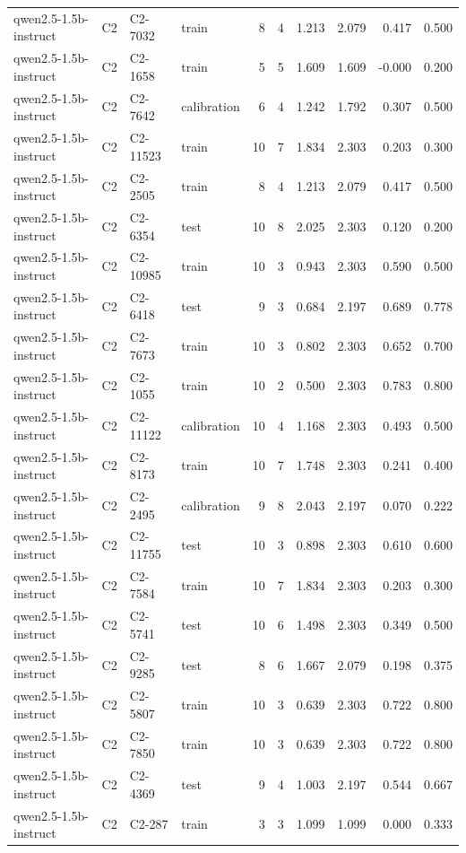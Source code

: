 \begin{table}
\begin{tabular}{llllrrrrrr}
qwen2.5-1.5b-instruct & C2 & C2-7032 & train & 8 & 4 & 1.213 & 2.079 & 0.417 & 0.500 \\
qwen2.5-1.5b-instruct & C2 & C2-1658 & train & 5 & 5 & 1.609 & 1.609 & -0.000 & 0.200 \\
qwen2.5-1.5b-instruct & C2 & C2-7642 & calibration & 6 & 4 & 1.242 & 1.792 & 0.307 & 0.500 \\
qwen2.5-1.5b-instruct & C2 & C2-11523 & train & 10 & 7 & 1.834 & 2.303 & 0.203 & 0.300 \\
qwen2.5-1.5b-instruct & C2 & C2-2505 & train & 8 & 4 & 1.213 & 2.079 & 0.417 & 0.500 \\
qwen2.5-1.5b-instruct & C2 & C2-6354 & test & 10 & 8 & 2.025 & 2.303 & 0.120 & 0.200 \\
qwen2.5-1.5b-instruct & C2 & C2-10985 & train & 10 & 3 & 0.943 & 2.303 & 0.590 & 0.500 \\
qwen2.5-1.5b-instruct & C2 & C2-6418 & test & 9 & 3 & 0.684 & 2.197 & 0.689 & 0.778 \\
qwen2.5-1.5b-instruct & C2 & C2-7673 & train & 10 & 3 & 0.802 & 2.303 & 0.652 & 0.700 \\
qwen2.5-1.5b-instruct & C2 & C2-1055 & train & 10 & 2 & 0.500 & 2.303 & 0.783 & 0.800 \\
qwen2.5-1.5b-instruct & C2 & C2-11122 & calibration & 10 & 4 & 1.168 & 2.303 & 0.493 & 0.500 \\
qwen2.5-1.5b-instruct & C2 & C2-8173 & train & 10 & 7 & 1.748 & 2.303 & 0.241 & 0.400 \\
qwen2.5-1.5b-instruct & C2 & C2-2495 & calibration & 9 & 8 & 2.043 & 2.197 & 0.070 & 0.222 \\
qwen2.5-1.5b-instruct & C2 & C2-11755 & test & 10 & 3 & 0.898 & 2.303 & 0.610 & 0.600 \\
qwen2.5-1.5b-instruct & C2 & C2-7584 & train & 10 & 7 & 1.834 & 2.303 & 0.203 & 0.300 \\
qwen2.5-1.5b-instruct & C2 & C2-5741 & test & 10 & 6 & 1.498 & 2.303 & 0.349 & 0.500 \\
qwen2.5-1.5b-instruct & C2 & C2-9285 & test & 8 & 6 & 1.667 & 2.079 & 0.198 & 0.375 \\
qwen2.5-1.5b-instruct & C2 & C2-5807 & train & 10 & 3 & 0.639 & 2.303 & 0.722 & 0.800 \\
qwen2.5-1.5b-instruct & C2 & C2-7850 & train & 10 & 3 & 0.639 & 2.303 & 0.722 & 0.800 \\
qwen2.5-1.5b-instruct & C2 & C2-4369 & test & 9 & 4 & 1.003 & 2.197 & 0.544 & 0.667 \\
qwen2.5-1.5b-instruct & C2 & C2-287 & train & 3 & 3 & 1.099 & 1.099 & 0.000 & 0.333 \\

\end{tabular}
\end{table}
